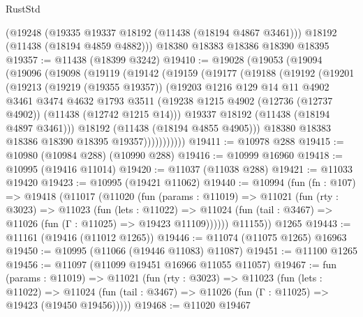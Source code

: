 \begin{lexlean}{RustStd}
\begin{coremodule}
    (@19248
      (@19335 @19337 @18192 (@11438 (@18194 @4867 @3461)))
      @18192
      (@11438 (@18194 @4859 @4882)))
    @18380
    @18383
    @18386
    @18390
    @18395
@19357 := @11438 (@18399 @3242)
@19410 := @19028
    (@19053
      (@19094
        (@19096
          (@19098
            (@19119
              (@19142
                (@19159
                  (@19177
                    (@19188
                      (@19192
                        (@19201
                          (@19213
                            (@19219 (@19355 @19357))
                            (@19203
                              @1216
                              @129
                              @14
                              @11
                              @4902
                              @3461
                              @3474
                              @4632
                              @1793
                              @3511
                              (@19238
                                @1215
                                @4902
                                (@12736 (@12737 @4902))
                                (@11438 (@12742 @1215 @14)))
                              @19337
                              @18192
                              (@11438 (@18194 @4897 @3461)))
                            @18192
                            (@11438 (@18194 @4855 @4905)))
                          @18380
                          @18383
                          @18386
                          @18390
                          @18395
                          @19357)))))))))))
@19411 := @10978 @288
@19415 := @10980 (@10984 @288) (@10990 @288)
@19416 := @10999 @16960
@19418 := @10995 (@19416 @11014)
@19420 := @11037 (@11038 @288)
@19421 := @11033 @19420
@19423 := @10995 (@19421 @11062)
@19440 := @10994
    (fun (fn : @107) =>
    @19418
      (@11017
        (@11020
          (fun (params : @11019) =>
          @11021
            (fun (rty : @3023) =>
            @11023
              (fun (lets : @11022) =>
              @11024 (fun (tail : @3467) => @11026 (fun (Γ : @11025) => @19423 @11109))))))
        @11155))
    @1265
@19443 := @11161 (@19416 (@11012 @1265))
@19446 := @11074 (@11075 @1265) @16963
@19450 := @10995 (@11066 (@19446 @11083) @11087)
@19451 := @11100 @1265
@19456 := @11097 (@11099 @19451 @16966 @11055 @11057)
@19467 := fun (params : @11019) =>
  @11021
    (fun (rty : @3023) =>
    @11023
      (fun (lets : @11022) =>
      @11024 (fun (tail : @3467) => @11026 (fun (Γ : @11025) => @19423 (@19450 @19456)))))
@19468 := @11020 @19467

\end{coremodule}
\end{lexlean}
